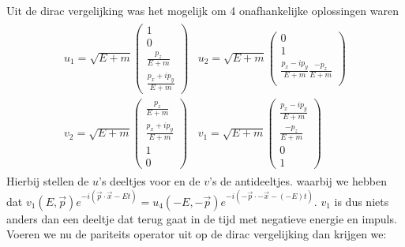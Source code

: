 \documentclass[../main.tex]{subfiles}
\begin{document}
Uit de dirac vergelijking was het mogelijk om 4 onafhankelijke oplossingen waren
\begin{equation}
    \begin{aligned}
        \label{eq:dirac_fermions}
        \begin{matrix}
            u_1 = \sqrt{E+m}
            \begin{pmatrix}
                1\\
                0\\
                \frac{p_z}{E+m}\\
                \frac{p_x + ip_y}{E+m} 
            \end{pmatrix} &
            u_2 = \sqrt{E+m}
            \begin{pmatrix}
                0\\
                1\\
                \frac{p_x - ip_y}{E+m} 
                \frac{-p_z}{E+m}\\
            \end{pmatrix} \\
            v_2 = \sqrt{E+m}
            \begin{pmatrix}
                \frac{p_z}{E+m}\\
                \frac{p_x + ip_y}{E+m}\\ 
                1\\
                0
            \end{pmatrix} &
            v_1 = \sqrt{E+m}
            \begin{pmatrix}
                \frac{p_x - ip_y}{E+m} \\
                \frac{-p_z}{E+m}\\
                0\\
                1
            \end{pmatrix}
        \end{matrix}
    \end{aligned}
\end{equation}
Hierbij stellen de $u$'s deeltjes voor en de $v$'s de antideeltjes. waarbij we hebben dat $v_1(E,\vec{p})e^{-i(\vec{p}\cdot \vec{x}-Et)} = u_4(-E,-\vec{p})e^{-i(-\vec{p}\cdot -\vec{x}-(-E)t)}$. $v_1$ is dus niets anders dan een deeltje dat terug gaat in de tijd met negatieve energie en impuls. Voeren we nu de pariteits operator uit op de dirac vergelijking dan krijgen we:
\end{document}
